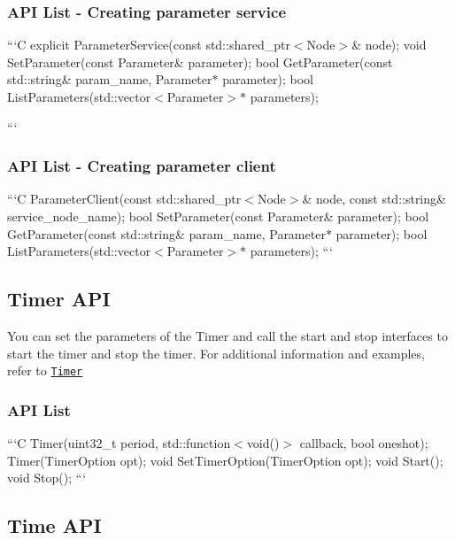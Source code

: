 {\ttfamily \subsubsection*{A\-P\-I List -\/ Creating parameter service}}

{\ttfamily }

{\ttfamily ```\-C explicit Parameter\-Service(const std\-::shared\-\_\-ptr$<$\-Node$>$\& node); void Set\-Parameter(const Parameter\& parameter); bool Get\-Parameter(const std\-::string\& param\-\_\-name, Parameter$\ast$ parameter); bool List\-Parameters(std\-::vector$<$\-Parameter$>$$\ast$ parameters);}

{\ttfamily ```}

{\ttfamily \subsubsection*{A\-P\-I List -\/ Creating parameter client}}

{\ttfamily }

{\ttfamily ```\-C Parameter\-Client(const std\-::shared\-\_\-ptr$<$\-Node$>$\& node, const std\-::string\& service\-\_\-node\-\_\-name); bool Set\-Parameter(const Parameter\& parameter); bool Get\-Parameter(const std\-::string\& param\-\_\-name, Parameter$\ast$ parameter); bool List\-Parameters(std\-::vector$<$\-Parameter$>$$\ast$ parameters); ```}

{\ttfamily \subsection*{Timer A\-P\-I}}

{\ttfamily  You can set the parameters of the Timer and call the start and stop interfaces to start the timer and stop the timer. For additional information and examples, refer to \href{#timer}{\tt Timer}}

{\ttfamily \subsubsection*{A\-P\-I List}}

{\ttfamily }

{\ttfamily ```\-C Timer(uint32\-\_\-t period, std\-::function$<$void()$>$ callback, bool oneshot); Timer(\-Timer\-Option opt); void Set\-Timer\-Option(\-Timer\-Option opt); void Start(); void Stop(); ```}

{\ttfamily \subsection*{Time A\-P\-I}}

